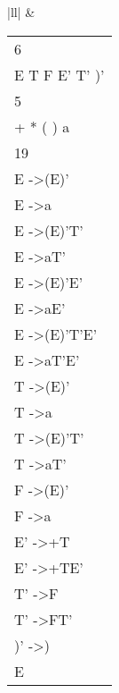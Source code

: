 \begin{table}[h!]
\begin{tabular}{|ll|}
     & \begin{tabular}[c]{@{}l@{}}6\\ E T F E' T' )'\\ 5\\ + * ( ) a\\ 19\\ E -\textgreater (E)'\\ E -\textgreater a\\ E -\textgreater (E)'T'\\ E -\textgreater aT'\\ E -\textgreater (E)'E'\\ E -\textgreater aE'\\ E -\textgreater (E)'T'E'\\ E -\textgreater aT'E'\\ T -\textgreater (E)'\\ T -\textgreater a\\ T -\textgreater (E)'T'\\ T -\textgreater aT'\\ F -\textgreater (E)'\\ F -\textgreater a\\ E' -\textgreater +T\\ E' -\textgreater +TE'\\ T' -\textgreater *F\\ T' -\textgreater *FT'\\ )' -\textgreater )\\ E\end{tabular} \\ \hline
    \end{tabular}
    \end{table}